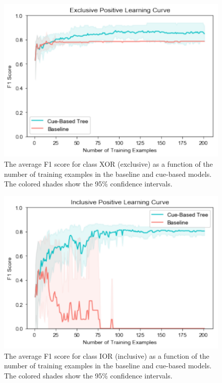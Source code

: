\documentclass[floatsintext,man]{apa6}
\theoremstyle{definition}
\theoremstyle{definition}
\theoremstyle{definition}
\theoremstyle{remark}
\begin{document}
\begin{figure}
\centering
\includegraphics{figs/XorBinary-1.pdf}
\caption{\label{fig:XorBinary}The average F1 score for class XOR (exclusive)
as a function of the number of training examples in the baseline and
cue-based models. The colored shades show the 95\% confidence
intervals.}
\end{figure}

\begin{figure}
\centering
\includegraphics{figs/IorBinary-1.pdf}
\caption{\label{fig:IorBinary}The average F1 score for class IOR (inclusive)
as a function of the number of training examples in the baseline and
cue-based models. The colored shades show the 95\% confidence
intervals.}
\end{figure}
\end{document}
